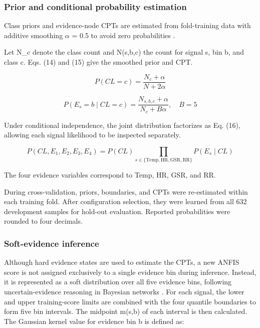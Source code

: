 \documentclass[runningheads]{llncs}
\begin{document}
\subsubsection{Prior and conditional probability estimation}

Class priors and evidence-node CPTs are estimated from fold-training data with additive smoothing $\alpha$ = 0.5 to avoid zero probabilities \cite{ref21}.

Let N\_c denote the class count and N(s,b,c) the count for signal s, bin b, and class c. Eqs. (14) and (15) give the smoothed prior and CPT.

\begin{equation}P(CL=c)=\frac{N_c+\alpha}{N+2\alpha}\tag{14}\end{equation}

\begin{equation}P(E_s=b\mid CL=c)=\frac{N_{s,b,c}+\alpha}{N_c+B\alpha},\quad B=5\tag{15}\end{equation}

Under conditional independence, the joint distribution factorizes as Eq. (16), allowing each signal likelihood to be inspected separately.

\begin{equation}P(CL,E_1,E_2,E_3,E_4)=P(CL)\prod_{s\in\{\mathrm{Temp,HR,GSR,RR}\}}P(E_s\mid CL)\tag{16}\end{equation}

The four evidence variables correspond to Temp, HR, GSR, and RR.

During cross-validation, priors, boundaries, and CPTs were re-estimated within each training fold. After configuration selection, they were learned from all 632 development samples for hold-out evaluation. Reported probabilities were rounded to four decimals.

\subsubsection{Soft-evidence inference}

Although hard evidence states are used to estimate the CPTs, a new ANFIS score is not assigned exclusively to a single evidence bin during inference. Instead, it is represented as a soft distribution over all five evidence bins, following uncertain-evidence reasoning in Bayesian networks \cite{ref22}. For each signal, the lower and upper training-score limits are combined with the four quantile boundaries to form five bin intervals. The midpoint m(s,b) of each interval is then calculated. The Gaussian kernel value for evidence bin b is defined as:
\end{document}
